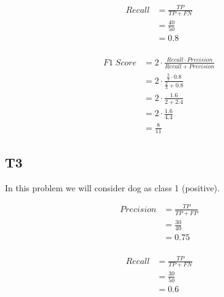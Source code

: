 \documentclass[12pt, a4paper]{article}
\begin{document}
\begin{equation}
    \label{Recall Cat}
    \begin{split}
        Recall & = \frac{TP}{TP + FN} \\
                & = \frac{40}{50} \\
                & = 0.8 \\
    \end{split}
\end{equation}

\begin{equation}
    \label{F1 Cat}
    \begin{split}
        F1\;Score & = 2 \cdot \frac{Recall \cdot Precision}{Recall + Precision} \\
                    & = 2 \cdot \frac{\frac{2}{3} \cdot 0.8}{\frac{2}{3} + 0.8} \\
                    & = 2 \cdot \frac{1.6}{2 + 2.4} \\
                    & = 2 \cdot \frac{1.6}{4.4} \\
                    & = \frac{8}{11}
    \end{split}
\end{equation}

\subsection{T3}

In this problem we will consider dog as class 1 (positive).

\begin{equation}
    \label{Precision Dog}
    \begin{split}
        Precision & = \frac{TP}{TP + FP} \\
                    & = \frac{30}{40} \\
                    & = 0.75 \\
    \end{split}
\end{equation}

\begin{equation}
    \label{Recall Dog}
    \begin{split}
        Recall & = \frac{TP}{TP + FN} \\
                & = \frac{30}{50} \\
                & = 0.6 \\
    \end{split}
\end{equation}
\end{document}
